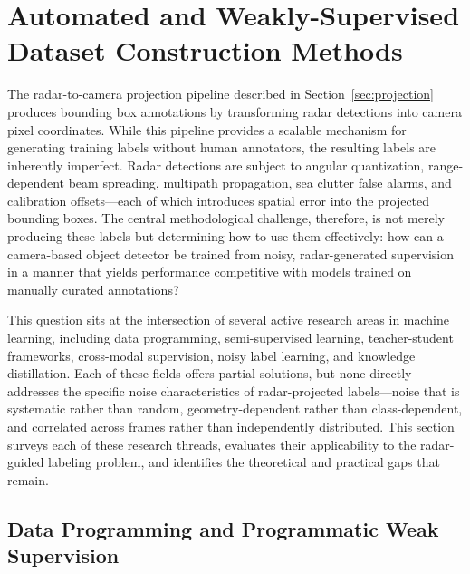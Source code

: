 \section{Automated and Weakly-Supervised Dataset Construction Methods}\label{sec:automated_construction}

The radar-to-camera projection pipeline described in Section~\ref{sec:projection} produces bounding box annotations by transforming radar detections into camera pixel coordinates. While this pipeline provides a scalable mechanism for generating training labels without human annotators, the resulting labels are inherently imperfect. Radar detections are subject to angular quantization, range-dependent beam spreading, multipath propagation, sea clutter false alarms, and calibration offsets---each of which introduces spatial error into the projected bounding boxes. The central methodological challenge, therefore, is not merely producing these labels but determining how to use them effectively: how can a camera-based object detector be trained from noisy, radar-generated supervision in a manner that yields performance competitive with models trained on manually curated annotations?

This question sits at the intersection of several active research areas in machine learning, including data programming, semi-supervised learning, teacher-student frameworks, cross-modal supervision, noisy label learning, and knowledge distillation. Each of these fields offers partial solutions, but none directly addresses the specific noise characteristics of radar-projected labels---noise that is systematic rather than random, geometry-dependent rather than class-dependent, and correlated across frames rather than independently distributed. This section surveys each of these research threads, evaluates their applicability to the radar-guided labeling problem, and identifies the theoretical and practical gaps that remain.



\subsection{Data Programming and Programmatic Weak Supervision}\label{subsec:data_programming}

